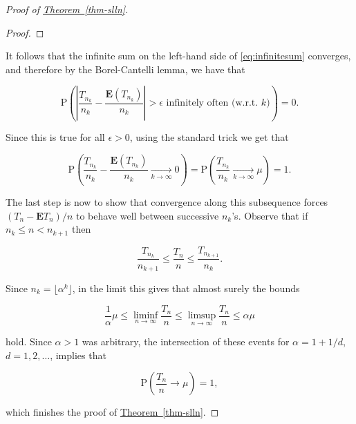 \begin{proof}[Proof of \texorpdfstring{\hyperref[thm-slln]{Theorem~\ref*{thm-slln}}}{Theorem}]
\begin{proof}
\end{proof}

\noindent It follows that the infinite sum on the left-hand
side of \eqref{eq:infinitesum} converges, and therefore by
the Borel-Cantelli lemma, we have that

\[
\mathrm{P}\left(\left|\frac{T_{n_k}}{n_k} - \frac{\mathbf{E}(T_{n_k})}{n_k}\right| > \epsilon\textrm{ infinitely often (w.r.t. } k \textrm{)}\right)
=0.
\]

\noindent Since this is true for all $\epsilon>0$, using the
standard trick we get that

\[
\mathrm{P}\left(\frac{T_{n_k}}{n_k} - \frac{\mathbf{E}(T_{n_k})}{n_k}\xrightarrow[k\to\infty]{}0\right) =
\mathrm{P}\left(\frac{T_{n_k}}{n_k}  \xrightarrow[k\to\infty]{}\mu\right) =  1.
\]

\noindent The last step is now to show that convergence along
this subsequence forces $(T_n-\mathbf{E} T_n)/n$ to
behave well between successive $n_k$'s. Observe that
if $n_k \le n < n_{k+1}$ then

\[
\frac{T_{n_k}}{n_{k+1}} \le \frac{T_n}{n} \le \frac{T_{n_{k+1}}}{n_k}.
\]

\noindent Since $n_k=\lfloor \alpha^k\rfloor$, in the limit
this gives that almost surely the bounds

\[
\frac{1}{\alpha} \mu \le \liminf_{n\to\infty} \frac{T_n}{n} \le \limsup_{n\to\infty} \frac{T_n}{n}
\le \alpha \mu
\]

\noindent hold. Since $\alpha>1$ was arbitrary, the
intersection of these events for $\alpha=1+1/d$,
$d=1,2,\ldots$, implies that

\[
\mathrm{P}\left( \frac{T_n}{n} \to\mu \right) = 1,
\]

\noindent which finishes the proof of \hyperref[thm-slln]{Theorem~\ref*{thm-slln}}.
\end{proof}
